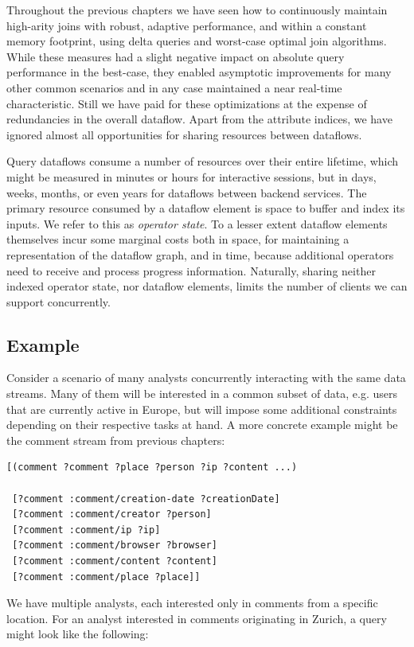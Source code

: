 \documentclass[../catalog.tex]{subfiles}
\begin{document}
Throughout the previous chapters we have seen how to continuously
maintain high-arity joins with robust, adaptive performance, and
within a constant memory footprint, using delta queries and worst-case
optimal join algorithms. While these measures had a slight negative
impact on absolute query performance in the best-case, they enabled
asymptotic improvements for many other common scenarios and in any
case maintained a near real-time characteristic. Still we have paid
for these optimizations at the expense of redundancies in the overall
dataflow. Apart from the attribute indices, we have ignored almost all
opportunities for sharing resources between dataflows.

Query dataflows consume a number of resources over their entire
lifetime, which might be measured in minutes or hours for interactive
sessions, but in days, weeks, months, or even years for dataflows
between backend services. The primary resource consumed by a dataflow
element is space to buffer and index its inputs. We refer to this as
\emph{operator state}. To a lesser extent dataflow elements themselves
incur some marginal costs both in space, for maintaining a
representation of the dataflow graph, and in time, because additional
operators need to receive and process progress information. Naturally,
sharing neither indexed operator state, nor dataflow elements, limits
the number of clients we can support concurrently.

\subsection{Example}

Consider a scenario of many analysts concurrently interacting with the
same data streams. Many of them will be interested in a common subset
of data, e.g. users that are currently active in Europe, but will
impose some additional constraints depending on their respective tasks
at hand. A more concrete example might be the comment stream from
previous chapters:

\begin{verbatim}
[(comment ?comment ?place ?person ?ip ?content ...)

 [?comment :comment/creation-date ?creationDate]
 [?comment :comment/creator ?person]
 [?comment :comment/ip ?ip]
 [?comment :comment/browser ?browser]
 [?comment :comment/content ?content]
 [?comment :comment/place ?place]]
\end{verbatim}

We have multiple analysts, each interested only in comments from a
specific location. For an analyst interested in comments originating
in Zurich, a query might look like the following:
\end{document}
